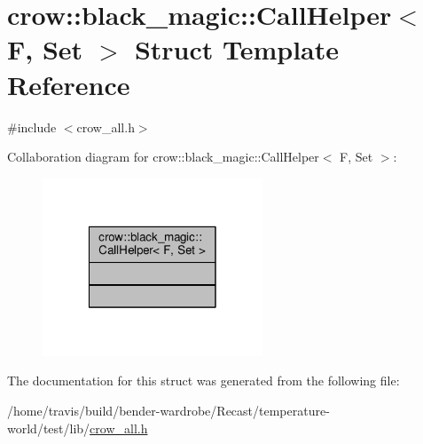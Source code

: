 \hypertarget{structcrow_1_1black__magic_1_1_call_helper}{\section{crow\-:\-:black\-\_\-magic\-:\-:Call\-Helper$<$ F, Set $>$ Struct Template Reference}
\label{structcrow_1_1black__magic_1_1_call_helper}
}


{\ttfamily \#include $<$crow\-\_\-all.\-h$>$}



Collaboration diagram for crow\-:\-:black\-\_\-magic\-:\-:Call\-Helper$<$ F, Set $>$\-:
\nopagebreak
\begin{figure}[H]
\begin{center}
\leavevmode
\includegraphics[width=186pt]{structcrow_1_1black__magic_1_1_call_helper__coll__graph}
\end{center}
\end{figure}


The documentation for this struct was generated from the following file\-:\begin{DoxyCompactItemize}
\item 
/home/travis/build/bender-\/wardrobe/\-Recast/temperature-\/world/test/lib/\hyperlink{crow__all_8h}{crow\-\_\-all.\-h}\end{DoxyCompactItemize}
